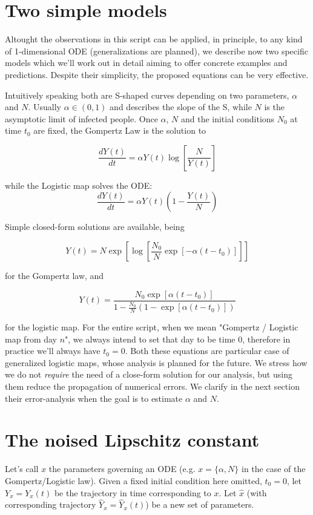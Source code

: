 \documentclass[6pt]{article}
\begin{document}
\section{Two simple models}
Altought the observations in this script can be applied, in principle,
to any kind of 1-dimensional ODE (generalizations are planned), we describe
now two specific models which we'll work out in detail
aiming to offer concrete examples and predictions.
Despite their simplicity, the proposed equations can be very effective.

Intuitively speaking both are S-shaped curves depending on two 
parameters, $\alpha$ and $N$. Usually
$\alpha \in (0, 1)$ and describes the slope of the S, while $N$ is the
asymptotic limit of infected people. Once $\alpha$, $N$ and the initial
conditions $N_0$ at time $t_0$ are fixed, the Gompertz Law is the solution to

\begin{equation}
\frac {dY (t)} {dt} = \alpha Y(t) \log[\frac{N} {Y(t)} ]
\end{equation}

while the Logistic map solves the ODE:
\begin{equation}
\frac {dY (t)} {dt} = \alpha Y(t) ( 1 - \frac{Y(t)}{N})
\end{equation}

Simple closed-form solutions are available, being

\begin{equation}
Y(t) = N \exp[ \log [ \frac{N_0}{N} \exp[-\alpha (t - t_0)]]]
\end{equation}

for the Gompertz law, and

\begin{equation}
Y(t) = \frac{N_0 \exp[\alpha(t - t_0)]}
	{1-\frac{N_0}{N} (1-\exp[\alpha(t-t_0)])}
\end{equation}

for the logistic map.
For the entire script, when we mean "Gompertz / Logistic map from day $n$",
we always intend to set that day to be time $0$, therefore
in practice we'll always have $t_0 = 0$.
Both these equations are particular case of 
generalized logistic maps, whose analysis is planned for the future.
We stress how we do not \emph{require} the need of a close-form solution
for our analysis, but using them reduce the propagation of numerical
errors. We clarify in the next section their error-analysis when
the goal is to estimate $\alpha$ and $N$.


\section{The noised Lipschitz constant}
Let's call $x$ the parameters governing an ODE (e.g. $x = \{ \alpha, N\}$
in the case of the Gompertz/Logistic law). Given a fixed initial condition here
omitted, $t_0 = 0$, 
let $Y_x = Y_x(t)$ be the trajectory in time corresponding to $x$.
Let $\hat{x}$ (with corresponding trajectory $\hat{Y}_x = \hat{Y}_x(t)$)
be a new set of parameters.
\end{document}
